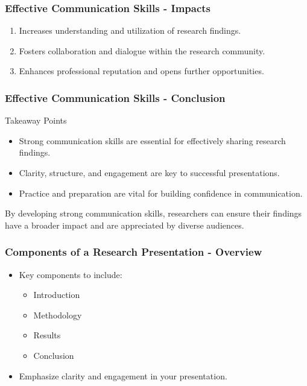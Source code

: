 \documentclass[aspectratio=169]{beamer}
\begin{document}
\begin{frame}[fragile]
    \frametitle{Effective Communication Skills - Impacts}
    \begin{enumerate}
        \item Increases understanding and utilization of research findings.
        \item Fosters collaboration and dialogue within the research community.
        \item Enhances professional reputation and opens further opportunities.
    \end{enumerate}
\end{frame}

\begin{frame}[fragile]
    \frametitle{Effective Communication Skills - Conclusion}
    \begin{block}{Takeaway Points}
        \begin{itemize}
            \item Strong communication skills are essential for effectively sharing research findings.
            \item Clarity, structure, and engagement are key to successful presentations.
            \item Practice and preparation are vital for building confidence in communication.
        \end{itemize}
    \end{block}
    By developing strong communication skills, researchers can ensure their findings have a broader impact and are appreciated by diverse audiences.
\end{frame}

\begin{frame}[fragile]
    \frametitle{Components of a Research Presentation - Overview}
    \begin{itemize}
        \item Key components to include:
            \begin{itemize}
                \item Introduction
                \item Methodology
                \item Results
                \item Conclusion
            \end{itemize}
        \item Emphasize clarity and engagement in your presentation.
    \end{itemize}
\end{frame}
\end{document}
